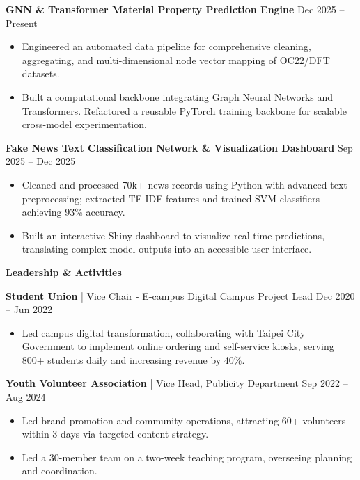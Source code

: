 \documentclass[11pt]{article}
\begin{document}
\vspace{2pt}
\textbf{GNN \& Transformer Material Property Prediction Engine} \hfill Dec 2025 -- Present  
\begin{itemize}[itemsep=0pt, parsep=0pt, topsep=1pt, partopsep=0pt, leftmargin=15pt]
    \item Engineered an automated data pipeline for comprehensive cleaning, aggregating, and multi-dimensional node vector mapping of OC22/DFT datasets.
    \item Built a computational backbone integrating Graph Neural Networks and Transformers. Refactored a reusable PyTorch training backbone for scalable cross-model experimentation.
\end{itemize}

\vspace{2pt}
\textbf{Fake News Text Classification Network \& Visualization Dashboard} \hfill Sep 2025 -- Dec 2025  
\begin{itemize}[itemsep=0pt, parsep=0pt, topsep=1pt, partopsep=0pt, leftmargin=15pt]
    \item Cleaned and processed 70k+ news records using Python with advanced text preprocessing; extracted TF-IDF features and trained SVM classifiers achieving 93\% accuracy.
    \item Built an interactive Shiny dashboard to visualize real-time predictions, translating complex model outputs into an accessible user interface.
\end{itemize}

\vspace{-5pt}
\begin{center}
    \textbf{Leadership \& Activities} \\
    \vspace{-5pt}
    \hrulefill
\end{center}
\vspace{-5pt}

\textbf{Student Union} | Vice Chair - E-campus Digital Campus Project Lead \hfill Dec 2020 -- Jun 2022  
\begin{itemize}[itemsep=0pt, parsep=0pt, topsep=0pt, partopsep=0pt, leftmargin=15pt]
    \item Led campus digital transformation, collaborating with Taipei City Government to implement online ordering and self-service kiosks, serving 800+ students daily and increasing revenue by 40\%.
\end{itemize}

\vspace{0pt}
\textbf{Youth Volunteer Association} | Vice Head, Publicity Department \hfill Sep 2022 -- Aug 2024  
\begin{itemize}[itemsep=0pt, parsep=0pt, topsep=0pt, partopsep=0pt, leftmargin=15pt]
    \item Led brand promotion and community operations, attracting 60+ volunteers within 3 days via targeted content strategy.
    \item Led a 30-member team on a two-week teaching program, overseeing planning and coordination.
\end{itemize}
\end{document}

